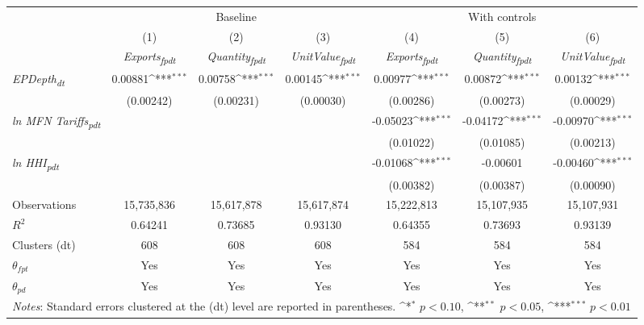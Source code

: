{
\def\sym#1{\ifmmode^{#1}\else\(^{#1}\)\fi}
\begin{tabular}{l*{6}{c}}
\toprule
&\multicolumn{3}{c}{Baseline}&\multicolumn{3}{c}{With controls}\\\cmidrule(lr){2-4}\cmidrule(lr){5-7}
&(1)&(2)&(3)&(4)&(5)&(6)\\
&\textit{Exports\textsubscript{fpdt}}&\textit{Quantity\textsubscript{fpdt}}&\textit{UnitValue\textsubscript{fpdt}}&\textit{Exports\textsubscript{fpdt}}&\textit{Quantity\textsubscript{fpdt}}&\textit{UnitValue\textsubscript{fpdt}}\\
\midrule
\textit{EPDepth\textsubscript{dt}} & 0.00881\sym{***} & 0.00758\sym{***} & 0.00145\sym{***} & 0.00977\sym{***} & 0.00872\sym{***} & 0.00132\sym{***}\\
 & (0.00242) & (0.00231) & (0.00030) & (0.00286) & (0.00273) & (0.00029)\\
\addlinespace
\textit{ln MFN Tariffs\textsubscript{pdt}} &  &  &  & -0.05023\sym{***} & -0.04172\sym{***} & -0.00970\sym{***}\\
 &  &  &  & (0.01022) & (0.01085) & (0.00213)\\
\addlinespace
\textit{ln HHI\textsubscript{pdt}} &  &  &  & -0.01068\sym{***} & -0.00601 & -0.00460\sym{***}\\
 &  &  &  & (0.00382) & (0.00387) & (0.00090)\\
\midrule
Observations & 15,735,836 & 15,617,878 & 15,617,874 & 15,222,813 & 15,107,935 & 15,107,931\\
$R^{2}$ & 0.64241 & 0.73685 & 0.93130 & 0.64355 & 0.73693 & 0.93139\\
Clusters (dt) & 608 & 608 & 608 & 584 & 584 & 584\\
$\theta_{fpt}$ & Yes & Yes & Yes & Yes & Yes & Yes\\
$\theta_{pd}$ & Yes & Yes & Yes & Yes & Yes & Yes\\
\bottomrule
\multicolumn{7}{l}{\footnotesize \textit{Notes}: Standard errors clustered at the (dt) level are reported in parentheses. \sym{*} \(p<0.10\), \sym{**} \(p<0.05\), \sym{***} \(p<0.01\)}\\
\end{tabular}
}
